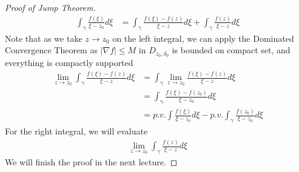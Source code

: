 \documentclass{article}
\begin{document}
\begin{proof}[Proof of Jump Theorem]
    \begin{align*}
        \int_\gamma \frac{f(\xi)}{\xi - z_0} d\xi &= \int_\gamma \frac{f(\xi) - f(z)}{\xi - z} d\xi + \int_\gamma \frac{f(z)}{\xi - z} d\xi
    \end{align*}
    Note that as we take $z \to z_0$ on the left integral, we can apply the Dominated Convergence Theorem as $|\nabla f| \leq M$ in $D_{z_0, \delta_0}$ is bounded on compact set, and everything is compactly supported
    \begin{align*}
        \lim_{z \to z_0}  \int_\gamma \frac{f(\xi) - f(z)}{\xi - z} d\xi &= \int_\gamma \lim_{z \to z_0} \frac{f(\xi) - f(z)}{\xi - z} d\xi \tag*{Dominated Convergence Theorem}\\
        &= \int_\gamma \frac{f(\xi) - f(z_0)}{\xi - z_0} d\xi\\
        &= p.v. \int \frac{f(\xi)}{\xi - z_0} d\xi - p.v. \int_\gamma \frac{f(z_0)}{\xi - z_0} d\xi \tag*{Existence of Principal Values left as Exercise}
    \end{align*}
    For the right integral, we will evaluate
    \begin{align*}
        \lim_{z \to z_0} \int_\gamma \frac{f(z)}{\xi - z} d\xi
    \end{align*}
    We will finish the proof in the next lecture.
\end{proof}
\end{document}
